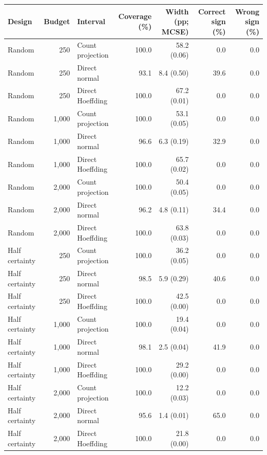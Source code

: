 \begin{tabular}{lrlrrrr}
\toprule
Design & Budget & Interval & Coverage (\%) & Width (pp; MCSE) & Correct sign (\%) & Wrong sign (\%) \\
\midrule
Random & 250 & Count projection & 100.0 & 58.2 (0.06) & 0.0 & 0.0 \\
Random & 250 & Direct normal & 93.1 & 8.4 (0.50) & 39.6 & 0.0 \\
Random & 250 & Direct Hoeffding & 100.0 & 67.2 (0.01) & 0.0 & 0.0 \\
Random & 1,000 & Count projection & 100.0 & 53.1 (0.05) & 0.0 & 0.0 \\
Random & 1,000 & Direct normal & 96.6 & 6.3 (0.19) & 32.9 & 0.0 \\
Random & 1,000 & Direct Hoeffding & 100.0 & 65.7 (0.02) & 0.0 & 0.0 \\
Random & 2,000 & Count projection & 100.0 & 50.4 (0.05) & 0.0 & 0.0 \\
Random & 2,000 & Direct normal & 96.2 & 4.8 (0.11) & 34.4 & 0.0 \\
Random & 2,000 & Direct Hoeffding & 100.0 & 63.8 (0.03) & 0.0 & 0.0 \\
Half certainty & 250 & Count projection & 100.0 & 36.2 (0.05) & 0.0 & 0.0 \\
Half certainty & 250 & Direct normal & 98.5 & 5.9 (0.29) & 40.6 & 0.0 \\
Half certainty & 250 & Direct Hoeffding & 100.0 & 42.5 (0.00) & 0.0 & 0.0 \\
Half certainty & 1,000 & Count projection & 100.0 & 19.4 (0.04) & 0.0 & 0.0 \\
Half certainty & 1,000 & Direct normal & 98.1 & 2.5 (0.04) & 41.9 & 0.0 \\
Half certainty & 1,000 & Direct Hoeffding & 100.0 & 29.2 (0.00) & 0.0 & 0.0 \\
Half certainty & 2,000 & Count projection & 100.0 & 12.2 (0.03) & 0.0 & 0.0 \\
Half certainty & 2,000 & Direct normal & 95.6 & 1.4 (0.01) & 65.0 & 0.0 \\
Half certainty & 2,000 & Direct Hoeffding & 100.0 & 21.8 (0.00) & 0.0 & 0.0 \\
\bottomrule
\end{tabular}
